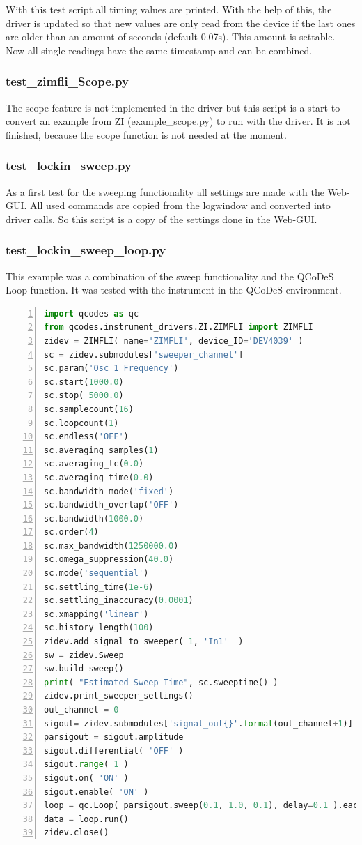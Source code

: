 \documentclass[11pt]{article} %
\begin{document}
With this test script all timing values are printed. With the help of this, the driver is updated so that new values are only read from the device if the last ones are older than an amount of seconds (default 0.07s). This amount is settable. Now all single readings have the same timestamp and can be combined.


\subsubsection{test\_zimfli\_Scope.py}
The scope feature is not implemented in the driver but this script is a start to convert an example from ZI (example\_scope.py) to run with the driver. It is not finished, because the scope function is not needed at the moment.


\subsubsection{test\_lockin\_sweep.py}
As a first test for the sweeping functionality all settings are made with the Web-GUI. All used commands are copied from the logwindow and converted into driver calls. So this script is a copy of the settings done in the Web-GUI.


\subsubsection{test\_lockin\_sweep\_loop.py}\label{lblsweepexam}
This example was a combination of the sweep functionality and the QCoDeS Loop function. It was tested with the instrument in the QCoDeS environment.

\begin{lstlisting}[frame=single, language=Python, numbers=left, xleftmargin=1cm]
import qcodes as qc
from qcodes.instrument_drivers.ZI.ZIMFLI import ZIMFLI
zidev = ZIMFLI( name='ZIMFLI', device_ID='DEV4039' )
sc = zidev.submodules['sweeper_channel']
sc.param('Osc 1 Frequency')
sc.start(1000.0)
sc.stop( 5000.0)
sc.samplecount(16)
sc.loopcount(1)
sc.endless('OFF')
sc.averaging_samples(1)
sc.averaging_tc(0.0)
sc.averaging_time(0.0)
sc.bandwidth_mode('fixed')
sc.bandwidth_overlap('OFF')
sc.bandwidth(1000.0)
sc.order(4)
sc.max_bandwidth(1250000.0)
sc.omega_suppression(40.0)
sc.mode('sequential')
sc.settling_time(1e-6)
sc.settling_inaccuracy(0.0001)
sc.xmapping('linear')
sc.history_length(100)
zidev.add_signal_to_sweeper( 1, 'In1'  )
sw = zidev.Sweep
sw.build_sweep()
print( "Estimated Sweep Time", sc.sweeptime() )
zidev.print_sweeper_settings()
out_channel = 0
sigout= zidev.submodules['signal_out{}'.format(out_channel+1)]
parsigout = sigout.amplitude
sigout.differential( 'OFF' )
sigout.range( 1 )
sigout.on( 'ON' )
sigout.enable( 'ON' )
loop = qc.Loop( parsigout.sweep(0.1, 1.0, 0.1), delay=0.1 ).each( sw )
data = loop.run()
zidev.close()
\end{lstlisting}
\end{document}
